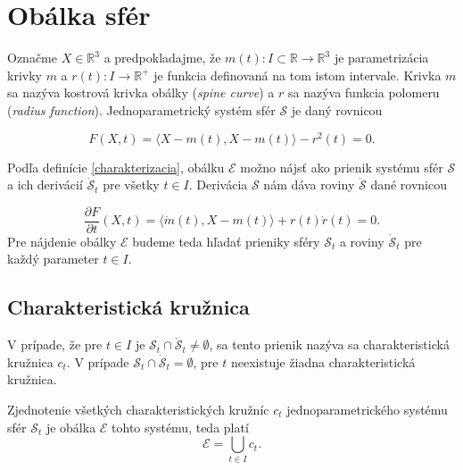 \section{Obálka sfér}
Označme $X \in \mathbb{R}^3$ a predpokladajme, že $m(t) \colon I \subset \mathbb{R} \rightarrow \mathbb{R}^3$ je parametrizácia krivky $m$ a $r(t) \colon I \rightarrow \mathbb{R}^{+}$ je funkcia definovaná na tom istom intervale. Krivka $m$ sa nazýva kostrová krivka obálky (\textit{spine curve}) a $r$ sa nazýva funkcia polomeru (\textit{radius function}). Jednoparametrický systém sfér $\mathcal{S}$ je daný rovnicou

$$
F(X, t) = \langle X - m(t), X - m(t) \rangle - r^2(t)= 0.
$$

Podľa definície \ref{charakterizacia}, obálku $\mathcal{E}$ možno nájsť ako prienik systému sfér $\mathcal{S}$ a ich derivácií $\mathcal{\dot{S}}_t$ pre všetky $t \in I$. Derivácia $\mathcal{S}$ nám dáva roviny $\mathcal{\dot{S}}$ dané rovnicou

$$
\dfrac{\partial F}{\partial t} (X, t) = \langle \dot{m}(t), X - m(t) \rangle + r(t) \dot{r}(t) = 0.
$$
Pre nájdenie obálky $\mathcal{E}$ budeme teda hľadať prieniky sféry $\mathcal{S}_t$ a roviny $\mathcal{\dot{S}}_t $ pre každý parameter $t \in I$.

\subsection{Charakteristická kružnica}
\begin{definition}
V prípade, že pre $t \in I$ je $\mathcal{S}_{t} \cap \mathcal{\dot{S}}_{t} \neq \emptyset$, sa tento prienik nazýva sa charakteristická kružnica $c_{t}$. V prípade $\mathcal{S}_{t} \cap \mathcal{\dot{S}}_{t} = \emptyset$, pre \(t\) neexistuje žiadna charakteristická kružnica.
\end{definition}

\begin{lemma} \label{lema o zjednoteni charakteristickych kruznic}
Zjednotenie všetkých charakteristických kružníc $c_{t}$ jednoparametrického systému sfér $\mathcal{S}_t$ je obálka $\mathcal{E}$ tohto systému, teda platí $$\mathcal{E} = \bigcup_{t \in I} c_{t}.$$
\end{lemma}

